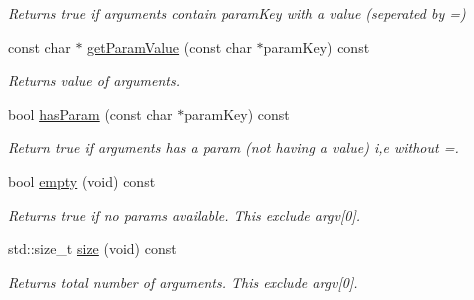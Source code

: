 \begin{DoxyCompactItemize}
\begin{DoxyCompactList}\small\item\em Returns true if arguments contain param\+Key with a value (seperated by \textquotesingle{}=\textquotesingle{}) \end{DoxyCompactList}\item 
const char $\ast$ \hyperlink{classel_1_1base_1_1utils_1_1CommandLineArgs_ad1abe08dfdbdd95c72474197ba4a3cbd}{get\+Param\+Value} (const char $\ast$param\+Key) const 
\begin{DoxyCompactList}\small\item\em Returns value of arguments. \end{DoxyCompactList}\item 
bool \hyperlink{classel_1_1base_1_1utils_1_1CommandLineArgs_a83fbd7e5d8422e98a7d58d65283f144f}{has\+Param} (const char $\ast$param\+Key) const \hypertarget{classel_1_1base_1_1utils_1_1CommandLineArgs_a83fbd7e5d8422e98a7d58d65283f144f}{}\label{classel_1_1base_1_1utils_1_1CommandLineArgs_a83fbd7e5d8422e98a7d58d65283f144f}

\begin{DoxyCompactList}\small\item\em Return true if arguments has a param (not having a value) i,e without \textquotesingle{}=\textquotesingle{}. \end{DoxyCompactList}\item 
bool \hyperlink{classel_1_1base_1_1utils_1_1CommandLineArgs_a014c586d14eb73f2ec1deb5b08bdd6a7}{empty} (void) const \hypertarget{classel_1_1base_1_1utils_1_1CommandLineArgs_a014c586d14eb73f2ec1deb5b08bdd6a7}{}\label{classel_1_1base_1_1utils_1_1CommandLineArgs_a014c586d14eb73f2ec1deb5b08bdd6a7}

\begin{DoxyCompactList}\small\item\em Returns true if no params available. This exclude argv\mbox{[}0\mbox{]}. \end{DoxyCompactList}\item 
std\+::size\+\_\+t \hyperlink{classel_1_1base_1_1utils_1_1CommandLineArgs_ab335b66a2ca2dea6c9c7b8d54760e975}{size} (void) const \hypertarget{classel_1_1base_1_1utils_1_1CommandLineArgs_ab335b66a2ca2dea6c9c7b8d54760e975}{}\label{classel_1_1base_1_1utils_1_1CommandLineArgs_ab335b66a2ca2dea6c9c7b8d54760e975}

\begin{DoxyCompactList}\small\item\em Returns total number of arguments. This exclude argv\mbox{[}0\mbox{]}. \end{DoxyCompactList}\end{DoxyCompactItemize}
